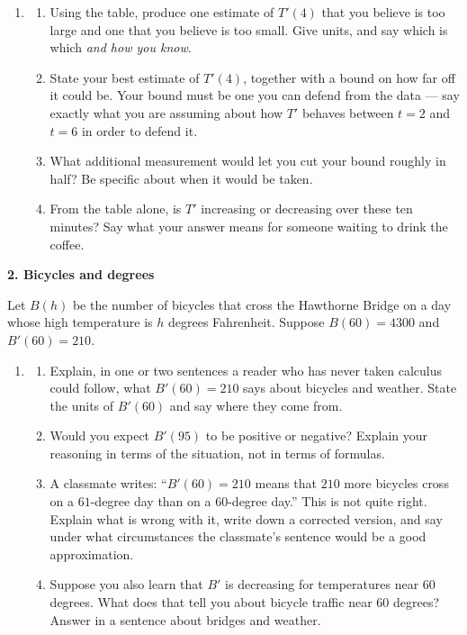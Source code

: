 \documentclass[11pt]{article}
\newcommand{\prob}[1]{\medskip\noindent\textbf{\large #1}\par\smallskip}
\begin{document}
\begin{enumerate}[resume]
\item[]
\begin{enumerate}
\item Using the table, produce one estimate of $T'(4)$ that you believe is too large
and one that you believe is too small. Give units, and say which is which
\emph{and how you know}.

\item State your best estimate of $T'(4)$, together with a bound on how far off it
could be. Your bound must be one you can defend from the data --- say exactly what you
are assuming about how $T'$ behaves between $t=2$ and $t=6$ in order to defend it.

\item What additional measurement would let you cut your bound roughly in half?
Be specific about when it would be taken.

\item From the table alone, is $T'$ increasing or decreasing over these ten minutes?
Say what your answer means for someone waiting to drink the coffee.
\end{enumerate}
\end{enumerate}

\prob{2. Bicycles and degrees}

Let $B(h)$ be the number of bicycles that cross the Hawthorne Bridge on a day whose
high temperature is $h$ degrees Fahrenheit. Suppose $B(60) = 4300$ and $B'(60) = 210$.

\begin{enumerate}[resume]
\item[]
\begin{enumerate}
\item Explain, in one or two sentences a reader who has never taken calculus could
follow, what $B'(60) = 210$ says about bicycles and weather. State the units of
$B'(60)$ and say where they come from.

\item Would you expect $B'(95)$ to be positive or negative? Explain your reasoning
in terms of the situation, not in terms of formulas.

\item A classmate writes: ``$B'(60) = 210$ means that $210$ more bicycles cross on a
$61$-degree day than on a $60$-degree day.'' This is not quite right. Explain what is
wrong with it, write down a corrected version, and say under what circumstances the
classmate's sentence would be a good approximation.

\item Suppose you also learn that $B'$ is decreasing for temperatures near $60$
degrees. What does that tell you about bicycle traffic near $60$ degrees? Answer in a
sentence about bridges and weather.
\end{enumerate}
\end{enumerate}
\end{document}
